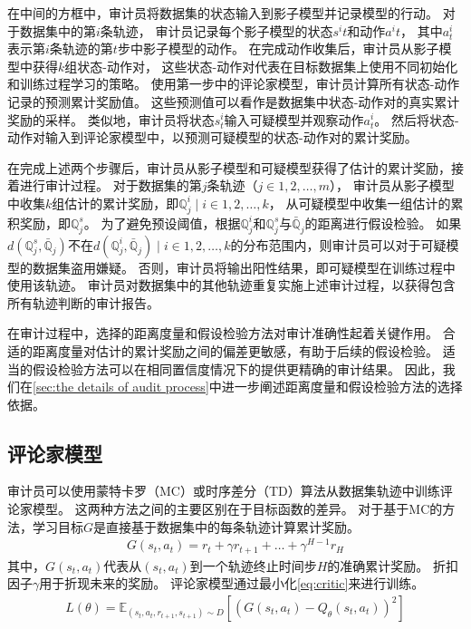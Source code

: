 在中间的方框中，审计员将数据集的状态输入到影子模型并记录模型的行动。
对于数据集中的第$i$条轨迹，
审计员记录每个影子模型的状态$s^{i}t$和动作$a^{i}{t}$，
其中$a^{i}_{t}$表示第$i$条轨迹的第$t$步中影子模型的动作。
在完成动作收集后，审计员从影子模型中获得$k$组状态-动作对，
这些状态-动作对代表在目标数据集上使用不同初始化和训练过程学习的策略。
使用第一步中的评论家模型，审计员计算所有状态-动作记录的预测累计奖励值。
这些预测值可以看作是数据集中状态-动作对的真实累计奖励的采样。
类似地，审计员将状态$s^i_t$输入可疑模型并观察动作$a^{i}_t$。
然后将状态-动作对输入到评论家模型中，以预测可疑模型的状态-动作对的累计奖励。

在完成上述两个步骤后，审计员从影子模型和可疑模型获得了估计的累计奖励，接着进行审计过程。
对于数据集的第$j$条轨迹（$j \in {1,2,\dots, m }$），
审计员从影子模型中收集$k$组估计的累计奖励，即${\mathbb{Q}_j^i \mid i \in {1,2,\dots, k}}$，
从可疑模型中收集一组估计的累积奖励，即$\mathbb{Q}_j^s$。
为了避免预设阈值，\sysnameo 根据$\mathbb{Q}_j^i$和$\mathbb{Q}_j^s$与$\bar{\mathbb{Q}}_j$的距离进行假设检验。
如果$d(\mathbb{Q}_j^s, \bar{\mathbb{Q}}_j)$不在${d(\mathbb{Q}_j^i, \bar{\mathbb{Q}}_j) \mid i \in {1,2,\dots, k}}$的分布范围内，则审计员可以对于可疑模型的数据集盗用嫌疑。
否则，审计员将输出阳性结果，即可疑模型在训练过程中使用该轨迹。
审计员对数据集中的其他轨迹重复实施上述审计过程，以获得包含所有轨迹判断的审计报告。

在审计过程中，选择的距离度量和假设检验方法对审计准确性起着关键作用。
合适的距离度量对估计的累计奖励之间的偏差更敏感，有助于后续的假设检验。
适当的假设检验方法可以在相同置信度情况下的提供更精确的审计结果。
因此，我们在\autoref{sec:the details of audit process}中进一步阐述距离度量和假设检验方法的选择依据。

\subsection{评论家模型}
\label{sec:the selection of critic model}
审计员可以使用蒙特卡罗（MC）或时序差分（TD）算法从数据集轨迹中训练评论家模型。
这两种方法之间的主要区别在于目标函数的差异。
对于基于MC的方法，学习目标$G$是直接基于数据集中的每条轨迹计算累计奖励。
\begin{equation}
    \begin{aligned}
    G(s_t, a_t)=r_{t}+\gamma r_{t+1}+\ldots+\gamma^{H-1} r_{H}
    \end{aligned}
\end{equation}
其中，$G(s_t, a_t)$代表从$(s_t, a_t)$到一个轨迹终止时间步$H$的准确累计奖励。
折扣因子$\gamma$用于折现未来的奖励。
评论家模型通过最小化\autoref{eq:critic}来进行训练。
\begin{equation}
    \label{eq:critic}
    \begin{aligned}
    L(\theta)=\mathbb{E}_{\left(s_t, a_t, r_{t+1}, s_{t+1}\right) \sim D}\left[\left(G\left(s_t, a_t\right)-Q_\theta\left(s_t, a_t\right)\right)^2\right]
    \end{aligned}
\end{equation}

